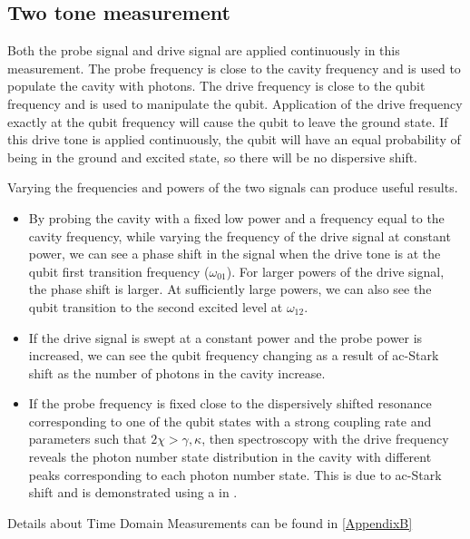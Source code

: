 \subsection{Two tone measurement}

Both the probe signal and drive signal are applied continuously in this measurement. The probe frequency is close to the cavity frequency and is used to populate the cavity with photons. The drive frequency is close to the qubit frequency and is used to manipulate the qubit. Application of the drive frequency exactly at the qubit frequency will cause the qubit to leave the ground state. If this drive tone is applied continuously, the qubit will have an equal probability of being in the ground and excited state, so there will be no dispersive shift.

Varying the frequencies and powers of the two signals can produce useful results.
\begin{itemize}
\item By probing the cavity with a fixed low power and a frequency equal to the cavity frequency, while varying the frequency of the drive signal at constant power, we can see a phase shift in the signal when the drive tone is at the qubit first transition frequency ($\omega_{01}$). For larger powers of the drive signal, the phase shift is larger. At sufficiently large powers, we can also see the qubit transition to the second excited level at $\omega_{12}$.
\item If the drive signal is swept at a constant power and the probe power is increased, we can see the qubit frequency changing as a result of ac-Stark shift as the number of photons in the cavity increase.
\item If the probe frequency is fixed close to the dispersively shifted resonance corresponding to one of the qubit states with a strong coupling rate and parameters such that $2\chi>\gamma,\kappa$, then spectroscopy with the drive frequency reveals the photon number state distribution in the cavity with different peaks corresponding to each photon number state. This is due to ac-Stark shift and is demonstrated using a \CPB in \cite{Schuster2007a}.
\end{itemize}

Details about Time Domain Measurements can be found in \ref{AppendixB}